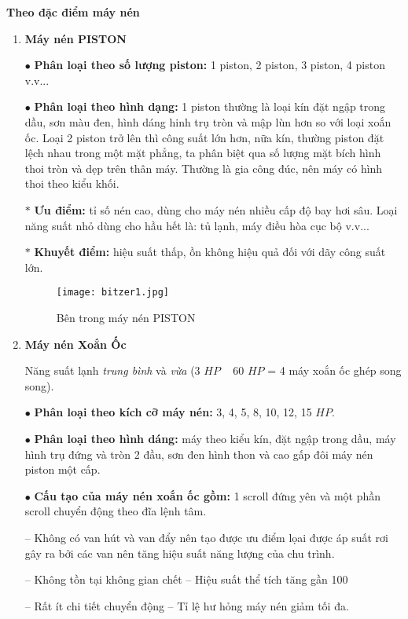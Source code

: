 	\textbf{Theo đặc điểm máy nén}
	\begin{enumerate}
		\setlength\itemsep{1mm}
		\item \textbf{Máy nén PISTON}
		
		$ \bullet $ \textbf{Phân loại theo số lượng piston:} 1 piston, 2 piston, 3 piston, 4 piston v.v...
		
		$ \bullet $ \textbf{Phân loại theo hình dạng:} 1 piston thường là loại kín đặt ngập trong dầu, sơn màu đen, hình dáng hinh trụ tròn và mập lùn hơn so với loại xoắn ốc. Loại 2 piston trở lên thì công suất lớn hơn, nữa kín, thường piston đặt lệch nhau trong một mặt phẳng, ta phân biệt qua số lượng mặt bích hình thoi tròn và dẹp trên thân máy. Thường là gia công đúc, nên máy có hình thoi theo kiểu khối.
		
		$ \ast $ \textbf{Ưu điểm:} tỉ số nén cao, dùng cho máy nén nhiều cấp độ bay hơi sâu. Loại năng suất nhỏ dùng cho hầu hết là: tủ lạnh, máy điều hòa cục bộ v.v...
		
		$ \ast $ \textbf{Khuyết điểm:} hiệu suất thấp, ồn không hiệu quả đối với dãy công suất lớn.
		
\begin{figure}[H]
	\centering
	\texttt{[image: bitzer1.jpg]}
	\caption{Bên trong máy nén PISTON}
\end{figure}		
		
		\item \textbf{Máy nén Xoắn Ốc} 
		
		Năng suất lạnh \textit{trung bình} và \textit{vừa} (3 $ HP $ ~ 60 $ HP $ = 4 máy xoắn ốc ghép song song).
		
		$ \bullet $ \textbf{Phân loại theo kích cỡ máy nén:} 3, 4, 5, 8, 10, 12, 15 $ HP $.
		
		$ \bullet $ \textbf{Phân loại theo hình dáng:} máy theo kiểu kín, đặt ngập trong dầu, máy hình trụ đứng và tròn 2 đầu, sơn đen hình thon và cao gấp đôi máy nén piston một cấp.
		
		$ \bullet $ \textbf{Cấu tạo của máy nén xoắn ốc gồm:} 1 scroll đứng yên và một phần scroll chuyển động theo đĩa lệnh tâm.
		
		– Không có van hút và van đẩy nên tạo được ưu điểm lọai được áp suất rơi gây ra bởi các van nên tăng hiệu suất năng lượng của chu trình.
		
		– Không tồn tại không gian chết – Hiệu suất thể tích tăng gần 100%
		
		– Rất ít chi tiết chuyển động – Tỉ lệ hư hỏng máy nén giảm tối đa.
		

\end{enumerate}
